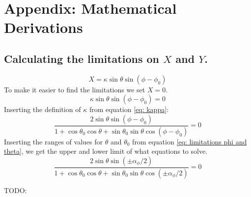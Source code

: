 \documentclass[reprint,english,notitlepage]{revtex4-2}
\begin{document}
\section{Appendix: Mathematical Derivations}
\subsection{Calculating the limitations on $ X $ and $ Y $.} \label{ssec: lim x,y}

\[
	X = κ  \sin θ \sin (ϕ - ϕ _0)
\]
To make it easier to find the limitations we set $ X = 0 $. 
\[
κ \sin θ \sin (ϕ - ϕ _0) = 0 
\]
Inserting the definition of $ κ $ from equation \ref{eq: kappa}:
\[
	\frac{2 \sin θ \sin (ϕ - ϕ _0)}{1 + \cos \theta _{0}\cos \theta + \sin \theta _{0} \sin \theta \cos (\phi - \phi _{0})} = 0
\]
Inserting the ranges of values for $ θ $ and $ θ_0 $ from equation \ref{eq: limitations phi and theta}, we get the upper and lower limit of what equations to solve. 
\[
\frac{2 \sin  θ \sin (\pm α_ϕ / 2)}{1 + \cos θ_0 \cos θ + \sin θ_0 \sin  θ \cos (\pm α_ϕ / 2)} = 0
\]


\newpage
TODO: %
\end{document}
